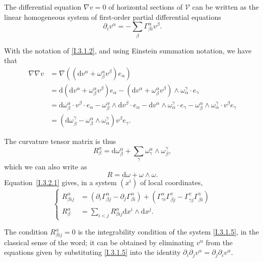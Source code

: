 \documentclass{report}
\theoremstyle{plain}
\theoremstyle{definition}
\newenvironment{env}[1]
    {\renewcommand\theinnercustomenv{#1}\innercustomenv}
    {\endinnercustomenv}
\newcommand{\sh}{\mathscr}
\newcommand{\dd}{\mathrm{d}}
\newcommand{\oldpage}[1]{\marginpar{\footnotesize$\Big\vert$ \textit{p.~#1}}}
\begin{document}
\begin{env}{3.1}
  The differential equation $\nabla v=0$ of horizontal sections of $\sh{V}$ can be written as the linear homogeneous system of first-order partial differential equations
  \[
  \label{I.3.1.5}
    \partial_i v^\alpha = -\sum_\beta \Gamma_{\beta i}^\alpha v^\beta.
  \tag{3.1.5}
  \]
\end{env}

\begin{env}{3.2}
\label{I.3.2}
  With the notation of \cref{I.3.1.2}, and using Einstein summation notation, we have that
  \[
    \begin{aligned}
      \nabla\nabla v
      &= \nabla((\dd v^\alpha + \omega_\beta^\alpha v^\beta)e_\alpha)
    \\&= \dd(\dd v^\alpha + \omega_\beta^\alpha v^\beta)e_\alpha - (\dd v^\alpha + \omega_\beta^\alpha v^\beta)\wedge\omega_\alpha^\gamma\cdot e_\gamma
    \\&= \dd\omega_\beta^\alpha\cdot v^\beta\cdot e_\alpha - \omega_\beta^\alpha\wedge\dd v^\beta\cdot e_\alpha - \dd v^\alpha\wedge\omega_\alpha^\gamma\cdot e_\gamma - \omega_\beta^\alpha\wedge\omega_\alpha^\gamma\cdot v^\beta e_\gamma
    \\&= (\dd\omega_\beta^\gamma - \omega_\beta^\alpha\wedge\omega_\alpha^\gamma)v^\beta e_\gamma.
    \end{aligned}
  \]

  The curvature tensor matrix is thus
\oldpage{23}
  \[
  \label{I.3.2.1}
    R_\beta^\alpha = \dd\omega_\beta^\alpha + \sum_\gamma \omega_\gamma^\alpha\wedge\omega_\beta^\gamma,
  \tag{3.2.1}
  \]
  which we can also write as
  \[
  \label{I.3.2.2}
    R = \dd\omega + \omega\wedge\omega.
  \tag{3.2.2}
  \]
  Equation~\cref{I.3.2.1} gives, in a system $(x^i)$ of local coordinates,
  \[
  \label{I.3.2.3}
    \begin{cases}
      R_{\beta i j}^\alpha
      &= (\partial_i\Gamma_{\beta j}^\alpha - \partial_j\Gamma_{\beta i}^\alpha) + (\Gamma_{\gamma i}^\alpha\Gamma_{\beta j}^\gamma - \Gamma_{\gamma j}^\gamma\Gamma_{\beta i}^\gamma)
    \\R_\beta^\alpha
      &= \sum_{i<j} R_{\beta i j}^\alpha \dd x^i\wedge\dd x^j.
    \end{cases}
  \tag{3.2.3}
  \]

  The condition $R_{\beta i j}^\alpha = 0$ is the integrability condition of the system \cref{I.3.1.5}, in the classical sense of the word;
  it can be obtained by eliminating $v^\alpha$ from the equations given by substituting \cref{I.3.1.5} into the identity $\partial_i\partial_j v^\alpha = \partial_j\partial_i v^\alpha$.
\end{env}
\end{document}

